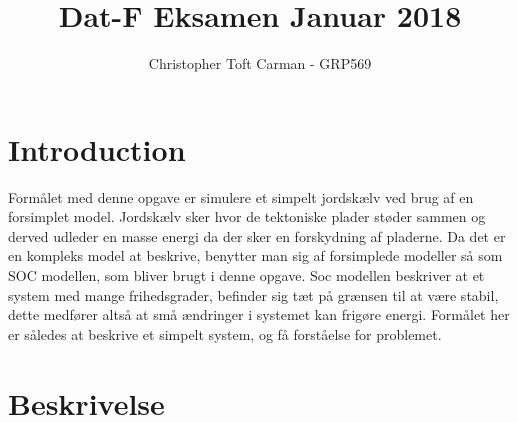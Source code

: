 \documentclass[11pt]{article}
\title{Dat-F Eksamen Januar 2018}
\author{Christopher Toft Carman - GRP569}
\date{}
\begin{document}
\maketitle
\newpage

\section{Introduction} %
\label{sec:introduction}
Formålet med denne opgave er simulere et simpelt jordskælv ved brug af en forsimplet model. 
Jordskælv sker hvor de tektoniske plader støder sammen og derved udleder en masse energi da der sker en forskydning af pladerne. 
Da det er en kompleks model at beskrive, benytter man sig af forsimplede modeller så som SOC modellen, som bliver brugt i denne opgave.
Soc modellen beskriver at et system med mange frihedsgrader, befinder sig tæt på grænsen til at være stabil, dette medfører altså at små ændringer i systemet kan frigøre energi. 
Formålet her er således at beskrive et simpelt system, og få forståelse for problemet. 


\section{Beskrivelse} %
\label{sec:beskrivelse}
\end{document}
